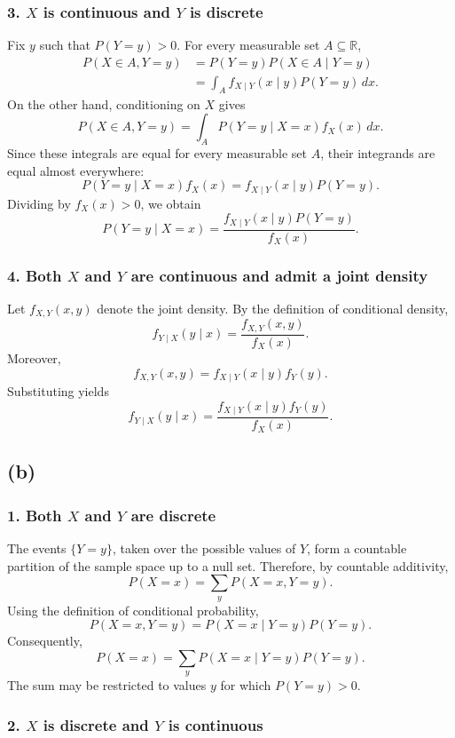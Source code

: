 \documentclass[11pt,a4paper]{article}
\begin{document}
\subsubsection*{3. \(X\) is continuous and \(Y\) is discrete}

Fix \(y\) such that \(P(Y=y)>0\). For every measurable set
\(A\subseteq\mathbb{R}\),
\[
\begin{aligned}
P(X\in A,Y=y)
&=
P(Y=y)P(X\in A\mid Y=y)\\
&=
\int_A f_{X\mid Y}(x\mid y)P(Y=y)\,dx.
\end{aligned}
\]
On the other hand, conditioning on \(X\) gives
\[
P(X\in A,Y=y)
=
\int_A P(Y=y\mid X=x)f_X(x)\,dx.
\]
Since these integrals are equal for every measurable set \(A\), their
integrands are equal almost everywhere:
\[
P(Y=y\mid X=x)f_X(x)
=
f_{X\mid Y}(x\mid y)P(Y=y).
\]
Dividing by \(f_X(x)>0\), we obtain
\[
P(Y=y\mid X=x)
=
\frac{f_{X\mid Y}(x\mid y)P(Y=y)}{f_X(x)}.
\]

\subsubsection*{4. Both \(X\) and \(Y\) are continuous and admit a joint density}

Let \(f_{X,Y}(x,y)\) denote the joint density. By the definition of
conditional density,
\[
f_{Y\mid X}(y\mid x)
=
\frac{f_{X,Y}(x,y)}{f_X(x)}.
\]
Moreover,
\[
f_{X,Y}(x,y)
=
f_{X\mid Y}(x\mid y)f_Y(y).
\]
Substituting yields
\[
f_{Y\mid X}(y\mid x)
=
\frac{f_{X\mid Y}(x\mid y)f_Y(y)}{f_X(x)}.
\]

\subsection*{(b)}
\subsubsection*{1. Both \(X\) and \(Y\) are discrete}

The events \(\{Y=y\}\), taken over the possible values of \(Y\), form
a countable partition of the sample space up to a null set. Therefore,
by countable additivity,
\[
P(X=x)=\sum_y P(X=x,Y=y).
\]
Using the definition of conditional probability,
\[
P(X=x,Y=y)
=
P(X=x\mid Y=y)P(Y=y).
\]
Consequently,
\[
P(X=x)
=
\sum_y P(X=x\mid Y=y)P(Y=y).
\]
The sum may be restricted to values \(y\) for which \(P(Y=y)>0\).

\subsubsection*{2. \(X\) is discrete and \(Y\) is continuous}
\end{document}
